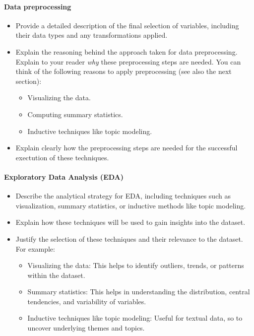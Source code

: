 \paragraph{Data preprocessing}
\begin{itemize}
    \item Provide a detailed description of  the final selection of variables, including their data types and any transformations applied.
    \item Explain the reasoning behind the approach taken for data preprocessing. Explain to your reader \emph{why} these preprocessing steps are needed. You can think of the following reasons to apply preprocessing (see also the next section):
        \begin{itemize}
            \item Visualizing the data.
            \item Computing summary statistics.
            \item Inductive techniques like topic modeling.
        \end{itemize}
  \item Explain clearly how the preprocessing steps are needed for the successful exectution of these techniques. 
\end{itemize}

\paragraph{Exploratory Data Analysis (EDA)}
\begin{itemize}
    \item Describe the analytical strategy for EDA, including techniques such as visualization, summary statistics, or inductive methods like topic modeling.
    \item Explain how these techniques will be used to gain insights into the dataset.
	\item Justify the selection of these techniques and their relevance to the dataset. For example:
	\begin{itemize}
		\item Visualizing the data: This helps to identify outliers, trends, or patterns within the dataset.
		\item Summary statistics: This helps in understanding the distribution, central tendencies, and variability of variables.
		\item Inductive techniques like topic modeling: Useful for textual data, so to uncover underlying themes and topics.
	\end{itemize}
\end{itemize}

